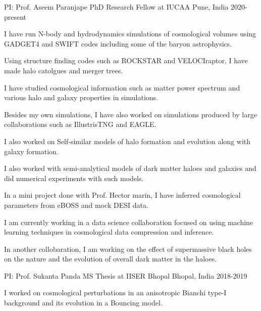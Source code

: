 \begin{cventries}

{
\cventry
{PI: Prof. Aseem Paranjape} %
{PhD Research Fellow at IUCAA} %
{Pune, India} %
{2020-present} %
{ %
\begin{cvitems}
\item {I have run N-body and hydrodynamics simulations of cosmological volumes using GADGET4 and SWIFT codes including some of the baryon astrophysics.}
\item {Using structure finding codes such as ROCKSTAR and VELOCIraptor, I have made halo catolgues and merger trees.}
\item {I have studied cosmological information such as matter power spectrum and various halo and galaxy properties in simulations.}
\item {Besides my own simulations, I have also worked on simulations produced by large collaborations such as IllustrisTNG and EAGLE.}
\item {I also worked on Self-similar models of halo formation and evolution along with galaxy formation.}
\item {I also worked with semi-analytical models of dark matter haloes and galaxies and did numerical experiments with such models.}
\item {In a mini project done with Prof. Hector marin, I have inferred cosmological parameters from eBOSS and mock DESI data.}
\item {I am currently working in a data science collaboration focused on using machine learning techniques in cosmological data compression and inference.}
\item {In another collobaration, I am working on the effect of supermassive black holes on the nature and the evolution of overall dark matter in the haloes.}
\end{cvitems}
}
}


{
\cventry
{PI: Prof. Sukanta Panda} %
{MS Thesis at IISER Bhopal} %
{Bhopal, India} %
{2018-2019} %
{ %
\begin{cvitems}
\item {I worked on cosmological perturbations in an anisotropic Bianchi type-I background and its evolution in a Bouncing model.}
\end{cvitems}
}
}

\end{cventries}


